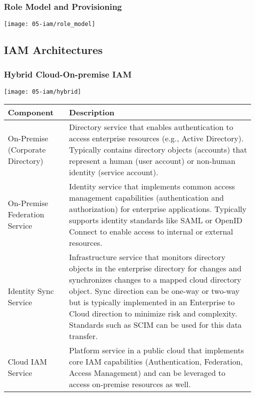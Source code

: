 \subsubsection{Role Model and Provisioning}
\begin{center}
    \texttt{[image: 05-iam/role\_model]}
    \vspace{-8pt}
\end{center}

\subsection{IAM Architectures}

\subsubsection{Hybrid Cloud-On-premise IAM}
\begin{center}
    \texttt{[image: 05-iam/hybrid]}
    \vspace{-8pt}
\end{center}

\begin{table}[h]
    \centering
    \begin{tabular}{p{4cm} | p{12cm}}
        \bfseries{Component} & \bfseries{Description}\\ \hline
        On-Premise (Corporate Directory) & Directory service that enables authentication to access enterprise resources (e.g., Active Directory). Typically contains directory objects (accounts) that represent a human (user account) or non-human identity (service account).\\ \hline
        On-Premise Federation Service & Identity service that implements common access management capabilities (authentication and authorization) for enterprise applications. Typically supports identity standards like SAML or OpenID Connect to enable access to internal or external resources.\\ \hline
        Identity Sync Service & Infrastructure service that monitors directory objects in the enterprise directory for changes and synchronizes changes to a mapped cloud directory object. Sync direction can be one-way or two-way but is typically implemented in an Enterprise to Cloud direction to minimize risk and complexity. Standards such as SCIM can be used for this data transfer.\\ \hline
        Cloud IAM Service & Platform service in a public cloud that implements core IAM capabilities (Authentication, Federation, Access Management) and can be leveraged to access on-premise resources as well.
    \end{tabular}
\end{table}

